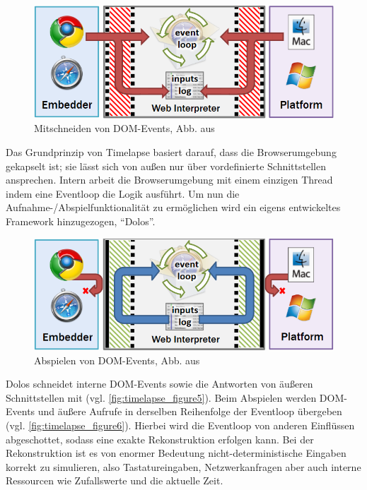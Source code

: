 \begin{figure}
\centering
\vspace{-\baselineskip}
\includegraphics[width=\linewidth]{img/03_methoden/timelapse_figure5.png}
\caption{Mitschneiden von DOM-Events, Abb. aus \cite{TimelapsePaper}}
\label{fig:timelapse_figure5}
\end{figure}

Das Grundprinzip von Timelapse basiert darauf, dass die Browserumgebung gekapselt ist; sie lässt sich von außen nur über vordefinierte Schnittstellen ansprechen. Intern arbeit die Browserumgebung mit einem einzigen Thread indem eine Eventloop die Logik ausführt. Um nun die Aufnahme-/Abspielfunktionalität zu ermöglichen wird ein eigens entwickeltes Framework hinzugezogen, \enquote{Dolos}.

\begin{figure}
\centering
\vspace{-\baselineskip}
\includegraphics[width=\linewidth]{img/03_methoden/timelapse_figure6.png}
\caption{Abspielen von DOM-Events, Abb. aus \cite{TimelapsePaper}}
\label{fig:timelapse_figure6}
\end{figure}

Dolos schneidet interne DOM-Events sowie die Antworten von äußeren Schnittstellen mit (vgl. \autoref{fig:timelapse_figure5}). Beim Abspielen werden DOM-Events und äußere Aufrufe in derselben Reihenfolge der Eventloop übergeben (vgl. \autoref{fig:timelapse_figure6}). Hierbei wird die Eventloop von anderen Einflüssen abgeschottet, sodass eine exakte Rekonstruktion erfolgen kann. Bei der Rekonstruktion ist es von enormer Bedeutung nicht-deterministische Eingaben korrekt zu simulieren, also Tastatureingaben, Netzwerkanfragen aber auch interne Ressourcen wie Zufallswerte und die aktuelle Zeit.

